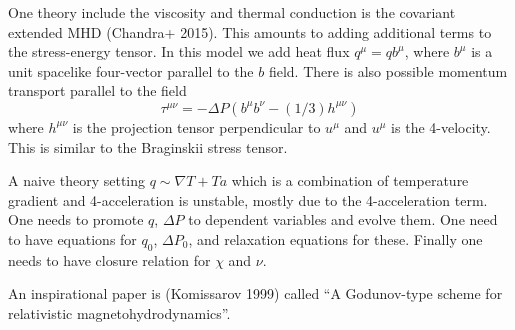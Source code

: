\documentclass[letterpaper, 11pt]{article}
\numberwithin{equation}{section}
\numberwithin{figure}{section}
\begin{document}
One theory include the viscosity and thermal conduction is the covariant
extended MHD (Chandra+ 2015). This amounts to adding additional terms to the
stress-energy tensor. In this model we add heat flux $q^{\mu} = q b^{\mu}$,
where $b^{\mu}$ is a unit spacelike four-vector parallel to the $b$ field. There
is also possible momentum transport parallel to the field
\begin{equation}
  \label{eq:38}
  \tau^{\mu\nu} = -\Delta P \left( b^{\mu}b^{\nu} - (1/3)h^{\mu\nu} \right)
\end{equation}
where $h^{\mu\nu}$ is the projection tensor perpendicular to $u^{\mu}$ and
$u^{\mu}$ is the 4-velocity. This is similar to the Braginskii stress tensor.

A naive theory setting $q \sim \nabla T + Ta$ which is a combination of
temperature gradient and 4-acceleration is unstable, mostly due to the
4-acceleration term. One needs to promote $q$, $\Delta P$ to dependent variables
and evolve them. One need to have equations for $q_0$, $\Delta P_0$, and
relaxation equations for these. Finally one needs to have closure relation for
$\chi$ and $\nu$.

An inspirational paper is (Komissarov 1999) called ``A Godunov-type scheme for
relativistic magnetohydrodynamics''.
\end{document}
